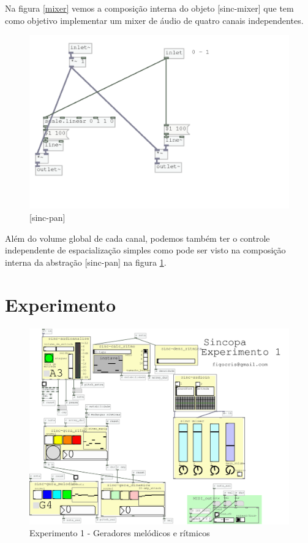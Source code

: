 \documentclass{ppgmus}
\begin{document}
Na figura \ref{mixer} vemos a composição interna do objeto
[sinc-mixer] que tem como objetivo implementar um mixer
de áudio de quatro canais independentes.

\begin{figure}
\includegraphics[scale=.4]{pan}
\caption{[sinc-pan]}
\label{pan}
\end{figure}

Além do volume global de cada canal, podemos também ter o controle
independente de espacialização simples como pode ser visto
na composição interna da abstração [sinc-pan] na figura \ref{pan}.

\section{Experimento}

\begin{figure}
\includegraphics[scale=.4]{experimento1}
\caption{Experimento 1 - Geradores melódicos e rítmicos}
\label{experimento1}
\end{figure}
\end{document}
